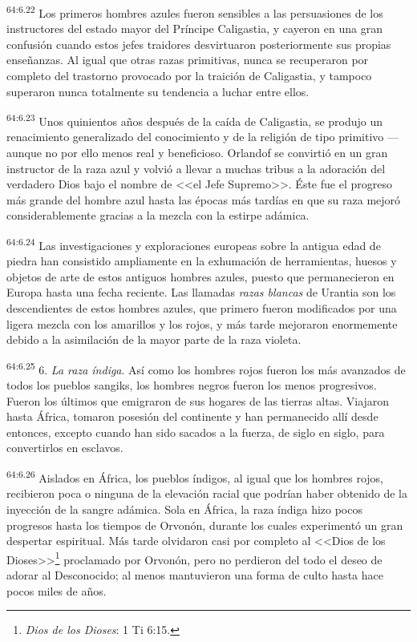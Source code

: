 \par
\textsuperscript{64:6.22} Los primeros hombres azules fueron sensibles a las persuasiones de los instructores del estado mayor del Príncipe Caligastia, y cayeron en una gran confusión cuando estos jefes traidores desvirtuaron posteriormente sus propias enseñanzas. Al igual que otras razas primitivas, nunca se recuperaron por completo del trastorno provocado por la traición de Caligastia, y tampoco superaron nunca totalmente su tendencia a luchar entre ellos.

\par
\textsuperscript{64:6.23} Unos quinientos años después de la caída de Caligastia, se produjo un renacimiento generalizado del conocimiento y de la religión de tipo primitivo ---aunque no por ello menos real y beneficioso. Orlandof se convirtió en un gran instructor de la raza azul y volvió a llevar a muchas tribus a la adoración del verdadero Dios bajo el nombre de <<el Jefe Supremo>>. Éste fue el progreso más grande del hombre azul hasta las épocas más tardías en que su raza mejoró considerablemente gracias a la mezcla con la estirpe adámica.

\par
\textsuperscript{64:6.24} Las investigaciones y exploraciones europeas sobre la antigua edad de piedra han consistido ampliamente en la exhumación de herramientas, huesos y objetos de arte de estos antiguos hombres azules, puesto que permanecieron en Europa hasta una fecha reciente. Las llamadas \textit{razas blancas} de Urantia son los descendientes de estos hombres azules, que primero fueron modificados por una ligera mezcla con los amarillos y los rojos, y más tarde mejoraron enormemente debido a la asimilación de la mayor parte de la raza violeta.

\par
\textsuperscript{64:6.25} 6. \textit{La raza índiga}. Así como los hombres rojos fueron los más avanzados de todos los pueblos sangiks, los hombres negros fueron los menos progresivos. Fueron los últimos que emigraron de sus hogares de las tierras altas. Viajaron hasta África, tomaron posesión del continente y han permanecido allí desde entonces, excepto cuando han sido sacados a la fuerza, de siglo en siglo, para convertirlos en esclavos.

\par
\textsuperscript{64:6.26} Aislados en África, los pueblos índigos, al igual que los hombres rojos, recibieron poca o ninguna de la elevación racial que podrían haber obtenido de la inyección de la sangre adámica. Sola en África, la raza índiga hizo pocos progresos hasta los tiempos de Orvonón, durante los cuales experimentó un gran despertar espiritual. Más tarde olvidaron casi por completo al <<Dios de los Dioses>>\footnote{\textit{Dios de los Dioses}: 1 Ti 6:15.} proclamado por Orvonón, pero no perdieron del todo el deseo de adorar al Desconocido; al menos mantuvieron una forma de culto hasta hace pocos miles de años.

